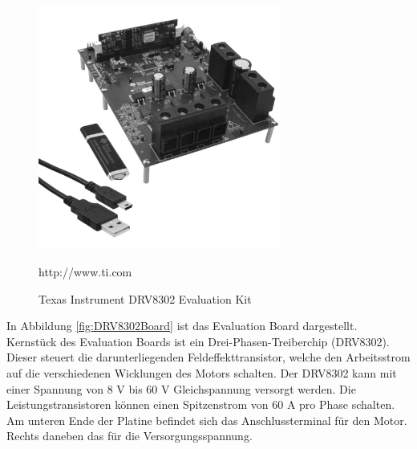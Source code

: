 \begin{figure}[h]
	\centering
	\includegraphics[width=8cm]{hardware/graphics/1189086_BB_00_FB}
	\caption[DRV8302 Evaluation Kit]{Texas Instrument DRV8302 Evaluation Kit}
	\quelle http://www.ti.com
	\label{fig:DRV8302EvalKit}
\end{figure}

In Abbildung \ref{fig:DRV8302Board} ist das Evaluation Board dargestellt.
Kernstück des Evaluation Boards ist ein Drei-Phasen-Treiberchip (DRV8302).
Dieser steuert die darunterliegenden Feldeffekttransistor, welche den Arbeitsstrom auf die verschiedenen Wicklungen des Motors schalten.
Der DRV8302 kann mit einer Spannung von 8 V bis 60 V Gleichspannung versorgt werden.
Die Leistungstransistoren können einen Spitzenstrom von 60 A pro Phase schalten.
Am unteren Ende der Platine befindet sich das Anschlussterminal für den Motor.
Rechts daneben das für die Versorgungsspannung.

